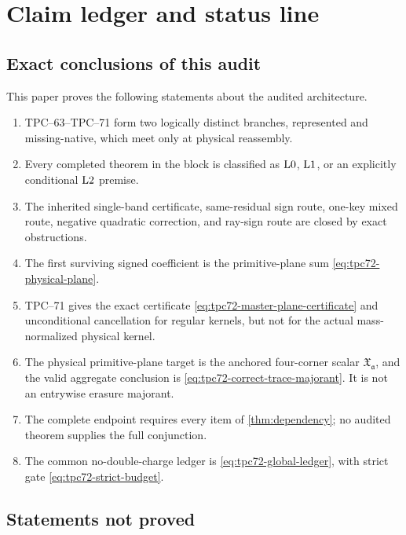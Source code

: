 \section{Claim ledger and status line}
\label{sec:claim-ledger}

\subsection{Exact conclusions of this audit}

This paper proves the following statements about the audited architecture.
\begin{enumerate}[label=\textup{(\arabic*)},leftmargin=3em]
 \item TPC--63--TPC--71 form two logically distinct branches, represented
       and missing-native, which meet only at physical reassembly.
 \item Every completed theorem in the block is classified as
       \(\mathrm{L0}\), \(\mathrm{L1}\), or an explicitly conditional \(\mathrm{L2}\)
       premise.
 \item The inherited single-band certificate, same-residual sign route,
       one-key mixed route, negative quadratic correction, and ray-sign
       route are closed by exact obstructions.
 \item The first surviving signed coefficient is the primitive-plane sum
       \eqref{eq:tpc72-physical-plane}.
 \item TPC--71 gives the exact certificate
       \eqref{eq:tpc72-master-plane-certificate} and unconditional
       cancellation for regular kernels, but not for the actual
       mass-normalized physical kernel.
 \item The physical primitive-plane target is the anchored four-corner
       scalar \(\mathfrak X_{\mathfrak a}\), and the valid aggregate
       conclusion is \eqref{eq:tpc72-correct-trace-majorant}.  It is not an
       entrywise erasure majorant.
 \item The complete endpoint requires every item of
       \cref{thm:dependency}; no audited theorem supplies the full
       conjunction.
 \item The common no-double-charge ledger is
       \eqref{eq:tpc72-global-ledger}, with strict gate
       \eqref{eq:tpc72-strict-budget}.
\end{enumerate}

\subsection{Statements not proved}

